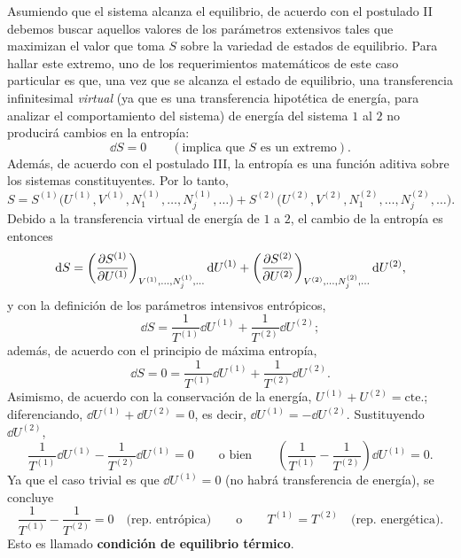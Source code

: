 Asumiendo que el sistema alcanza el equilibrio, de acuerdo con el postulado II debemos buscar
aquellos valores de los parámetros extensivos tales que maximizan el valor que toma $S$ sobre la
variedad de estados de equilibrio. Para hallar este extremo, uno de los requerimientos matemáticos
de este caso particular es que, una vez que se alcanza el estado de equilibrio, una transferencia
infinitesimal \emph{virtual} (ya que es una transferencia hipotética de energía, para analizar el
comportamiento del sistema) de energía del sistema $1$ al $2$ no producirá cambios en la entropía:
\begin{equation*}
  \dd S=0\qquad(\text{implica que }S\text{ es un extremo}).
\end{equation*}
Además, de acuerdo con el postulado III, la entropía es una función aditiva sobre los sistemas
constituyentes. Por lo tanto,
\begin{equation*}
  S=S^{(1)}\bigl(U^{(1)},V^{(1)},N_1^{(1)},\dots,N_j^{(1)},\dots\bigr)+S^{(2)}\bigl(U^{(2)},V^{(2)},N_1^{(2)},\dots,N_j^{(2)},\dots\bigr).
\end{equation*}
Debido a la transferencia virtual de energía de $1$ a $2$, el cambio de la entropía es entonces
\begin{equation*}
  \dd S=\left(\frac{\partial S^{(1)}}{\partial U^{(1)}}\right)_{V^{(1)},\dots,N_j^{(1)},\dots}\dd U^{(1)}+\left(\frac{\partial S^{(2)}}{\partial U^{(2)}}\right)_{V^{(2)},\dots,N_j^{(2)},\dots}\dd U^{(2)},
\end{equation*}
y con la definición de los parámetros intensivos entrópicos,
\begin{equation*}
  \dd S=\frac{1}{T^{(1)}}\dd U^{(1)}+\frac{1}{T^{(2)}}\dd U^{(2)};
\end{equation*}
además, de acuerdo con el principio de máxima entropía,
\begin{equation*}
  \dd S=0=\frac{1}{T^{(1)}}\dd U^{(1)}+\frac{1}{T^{(2)}}\dd U^{(2)}.
\end{equation*}
Asimismo, de acuerdo con la conservación de la energía, $U^{(1)}+U^{(2)}=\text{cte.}$; diferenciando,
$\dd U^{(1)}+\dd U^{(2)}=0$, es decir, $\dd U^{(1)}=-\dd U^{(2)}$. Sustituyendo $\dd U^{(2)}$,
\begin{equation*}
  \frac{1}{T^{(1)}}\dd U^{(1)}-\frac{1}{T^{(2)}}\dd U^{(1)}=0
  \qquad\text{o bien}\qquad
  \left(\frac{1}{T^{(1)}}-\frac{1}{T^{(2)}}\right)\dd U^{(1)}=0.
\end{equation*}
Ya que el caso trivial es que $\dd U^{(1)}=0$ (no habrá transferencia de energía), se concluye
\begin{equation*}
  \boxed{\frac{1}{T^{(1)}}-\frac{1}{T^{(2)}}=0}\quad\text{(rep.\ entrópica)}
  \qquad\text{o}\qquad
  \boxed{T^{(1)}=T^{(2)}}\quad\text{(rep.\ energética)}.
\end{equation*}
Esto es llamado \textbf{condición de equilibrio térmico}.

